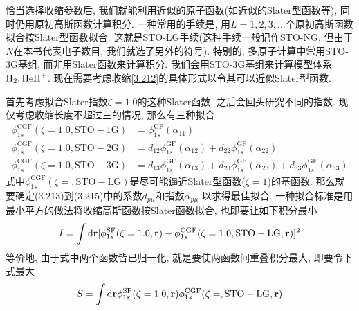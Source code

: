 恰当选择收缩参数后, 
我们就能利用近似的原子\hft 函数(如近似的Slater型函数等), 
同时仍用原初高斯函数计算积分. 
一种常用的手续是, 
用$L=1,2,3,\ldots$个原初高斯函数拟合按Slater型函数拟合. 
这就是STO-LG手续(这种手续一般记作STO-NG, 
但由于$N$在本书代表电子数目, 
我们就选了另外的符号). 
特别的, 
多原子计算中常用STO-3G基组, 
而非用Slater函数来计算积分. 
我们会用STO-3G基组来计算模型体系$\mathrm{H}_2,\mathrm{HeH}^+$. 
现在需要考虑收缩\autoref{3.212}的具体形式以令其可以近似Slater型函数.


首先考虑拟合Slater指数$\zeta=1.0$的这种Slater函数. 
之后会回头研究不同的指数. 
现仅考虑收缩长度不超过三的情况, 
那么有三种拟合
\begin{align}
	\phi_{1s}^\mathrm{CGF}(\zeta=1.0, \mathrm{STO-1G}) &= \phi_{1s}^\mathrm{GF}(\alpha_{11})\\
	\phi_{1s}^\mathrm{CGF}(\zeta=1.0, \mathrm{STO-2G}) &= d_{12}\phi_{1s}^\mathrm{GF}(\alpha_{12}) + d_{22}\phi_{1s}^\mathrm{GF}(\alpha_{22})\\
	\phi_{1s}^\mathrm{CGF}(\zeta=1.0, \mathrm{STO-3G}) &= d_{13}\phi_{1s}^\mathrm{GF}(\alpha_{13}) + d_{23}\phi_{1s}^\mathrm{GF}(\alpha_{23}) + d_{33}\phi_{1s}^\mathrm{GF}(\alpha_{33})
\end{align}
式中$\phi_{1s}^\mathrm{CGF}(\zeta=, \mathrm{STO-LG})$是尽可能逼近Slater型函数($\zeta=1$)的基函数. 
那么就要确定(3.213)到(3.215)中的系数$d_{p\mu}$和指数$\alpha_{p\mu}$
以求得最佳拟合. 
一种拟合标准是用最小平方的做法将收缩高斯函数按Slater函数拟合,
也即要让如下积分最小
\begin{align}
	I = \int\dd{r}[\phi_{1s}^\mathrm{SF}(\zeta=1.0,\bfr) - \phi_{1s}^\mathrm{CGF}(\zeta=1.0, \mathrm{STO-LG},\bfr)]^2
\end{align}
等价地, 
由于式中两个函数皆已归一化, 
就是要使两函数间重叠积分最大, 
即要令下式最大
\begin{align}
	S = \int\dd{r}\phi_{1s}^\mathrm{SF}(\zeta=1.0,\bfr)\phi_{1s}^\mathrm{CGF}(\zeta=, \mathrm{STO-LG},\bfr)
\end{align}

